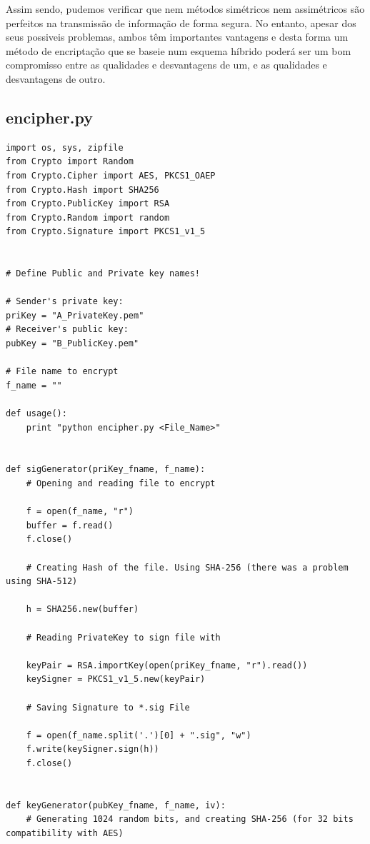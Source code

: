 \documentclass[a4paper,11pt,openright,oneside]{report}
\begin{document}
Assim sendo, pudemos verificar que nem métodos simétricos nem assimétricos são perfeitos na transmissão de informação de forma segura. No entanto, apesar dos seus possiveis problemas, ambos têm importantes vantagens e desta forma um método de encriptação que se baseie num esquema híbrido poderá ser um bom compromisso entre as qualidades e desvantagens de um, e as qualidades e desvantagens de outro. 

\newpage

\begin{appendices}
\section{encipher.py}
\label{encipher.py}

\begin{verbatim}
import os, sys, zipfile
from Crypto import Random
from Crypto.Cipher import AES, PKCS1_OAEP
from Crypto.Hash import SHA256
from Crypto.PublicKey import RSA
from Crypto.Random import random
from Crypto.Signature import PKCS1_v1_5


# Define Public and Private key names!

# Sender's private key:
priKey = "A_PrivateKey.pem"
# Receiver's public key:
pubKey = "B_PublicKey.pem"

# File name to encrypt
f_name = ""

def usage():
    print "python encipher.py <File_Name>"


def sigGenerator(priKey_fname, f_name):
    # Opening and reading file to encrypt

    f = open(f_name, "r")
    buffer = f.read()
    f.close()

    # Creating Hash of the file. Using SHA-256 (there was a problem using SHA-512)

    h = SHA256.new(buffer)

    # Reading PrivateKey to sign file with

    keyPair = RSA.importKey(open(priKey_fname, "r").read())
    keySigner = PKCS1_v1_5.new(keyPair)

    # Saving Signature to *.sig File

    f = open(f_name.split('.')[0] + ".sig", "w")
    f.write(keySigner.sign(h))
    f.close()


def keyGenerator(pubKey_fname, f_name, iv):
    # Generating 1024 random bits, and creating SHA-256 (for 32 bits compatibility with AES)


\end{verbatim}
\end{appendices}
\end{document}
